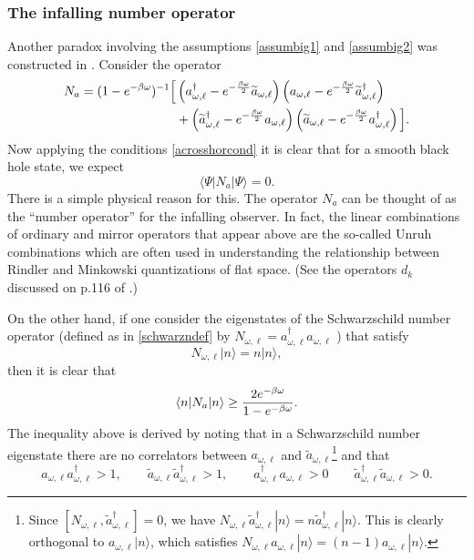 \documentclass[12pt]{article}
\def\schwarzn{N}
\newcommand{\cop}[1]{#1}
\def\ta{\widetilde{\cop{a}}}
\newcommand{\be}{\begin{equation}}
\newcommand{\ee}{\end{equation}}
\begin{document}
\subsubsection{The infalling number operator}
Another paradox involving the assumptions \ref{assumbig1} and \ref{assumbig2} was constructed in \cite{Marolf:2013dba}. Consider the operator 
\be
\label{nadef}
\begin{split}
N_a = (1 -e^{- \beta \omega})^{-1} \Big[ &\left(a_{\omega, \ell}^{\dagger} - e^{-{\beta \omega\over 2} }\ta_{\omega, \ell} \right) \left(a_{\omega, \ell}- e^{-{\beta \omega\over 2} } \ta_{\omega, \ell}^{\dagger} \right) \\ &+ \left( \ta_{\omega, \ell}^{\dagger} - e^{-{\beta \omega\over 2} } a_{\omega, \ell} \right) \left( \ta_{\omega, \ell}- e^{-{\beta \omega\over 2} }a_{\omega, \ell}^{\dagger} \right)  \Big]. 
\end{split}
\ee
Now applying the conditions \eqref{acrosshorcond} it is clear that for a smooth black hole state, we expect
\be
\label{naintypical}
\langle \Psi | N_a | \Psi \rangle = 0.
\ee
There is a simple physical reason for this. The operator $N_a$ can be thought of as the ``number operator'' for the infalling observer. In fact, the linear combinations of ordinary and mirror operators that appear above are the so-called Unruh combinations which are often used in understanding the relationship between Rindler and Minkowski quantizations of flat space. (See the operators $d_k$ discussed on p.116 of \cite{birrell1984quantum}.)

On the other hand, if one consider the eigenstates of the Schwarzschild number operator (defined as in \eqref{schwarzndef} by $\schwarzn_{\omega, \ell}=a_{\omega, \ell}^{\dagger} a_{\omega, \ell}$ ) that satisfy
\be
\schwarzn_{\omega, \ell} |n \rangle = n |n \rangle,
\ee
then it is clear that
\be
\label{nanineq}
\langle n| N_a | n \rangle \geq {2 e^{-\beta \omega} \over 1 - e^{-\beta \omega}}.
\ee
The inequality above is derived by noting that in a Schwarzschild number eigenstate there are no correlators between $a_{\omega, \ell}$ and $\ta_{\omega, \ell}$\footnote{Since $[N_{\omega, \ell}, \ta^{\dagger}_{\omega, \ell}] = 0$, we have $N_{\omega, \ell} \ta^{\dagger}_{\omega, \ell} |n \rangle = n \ta^{\dagger}_{\omega, \ell} | n \rangle$. This is clearly orthogonal to  $a_{\omega, \ell} |n \rangle$, which satisfies $N_{\omega, \ell} a_{\omega, \ell} |n \rangle = (n-1) a_{\omega, \ell} |n \rangle$.} and that
\be
a_{\omega, \ell} a_{\omega, \ell}^{\dagger} > 1, \qquad \ta_{\omega, \ell} \ta_{\omega, \ell}^{\dagger} > 1, \qquad a_{\omega, \ell}^{\dagger} a_{\omega, \ell} > 0 \qquad \ta_{\omega, \ell}^{\dagger} \ta_{\omega, \ell} > 0.
\ee
\end{document}
